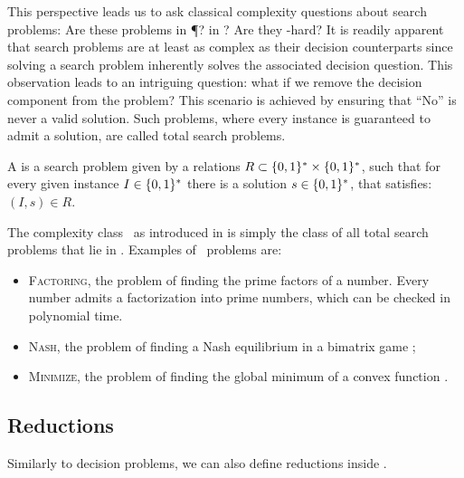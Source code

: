 This perspective leads us to ask classical complexity questions about search problems: Are these problems in \P? in \NP? Are they \NP-hard? It is readily apparent that search problems are at least as complex as their decision counterparts since solving a search problem inherently solves the associated decision question. This observation leads to an intriguing question: what if we remove the decision component from the problem? This scenario is achieved by ensuring that ``No'' is never a valid solution. Such problems, where every instance is guaranteed to admit a solution, are called total search problems.

\begin{definition}
    A  is a search problem given by a relations $R\subset \{0, 1\}^* \times \{0, 1\}^*$, such that for every given instance $I\in
        \{0, 1\}^*$ there is a solution $s \in \{0, 1\}^*$, that satisfies: $(I, s) \in R$.
\end{definition}

The complexity class \TFNP\ as introduced in  is simply the class of all total search problems that lie in \NP. Examples of \TFNP\ problems are:
\begin{itemize}
    \item \textsc{Factoring}, the problem of finding the prime factors of a number. Every number admits a factorization into prime numbers, which can be checked in polynomial time.
    \item \textsc{Nash}, the problem of finding a Nash equilibrium in a bimatrix game ;
    \item \textsc{Minimize}, the problem of finding the global minimum of a convex function .
\end{itemize}

\subsection{Reductions}

Similarly to decision problems, we can also define reductions inside \TFNP.

